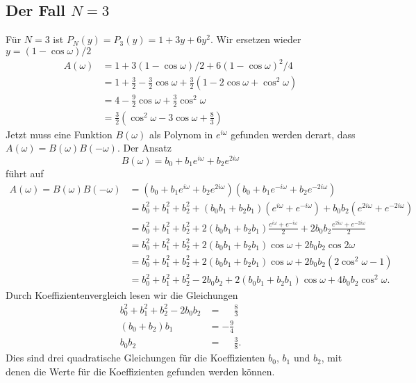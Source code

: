 \subsection{Der Fall $N=3$}
Für $N=3$ ist $P_N(y)=P_3(y)=1+3y+6y^2$.
Wir ersetzen wieder $y=(1-\cos\omega)/2$ 
\begin{align*}
A(\omega)
&=
1+3(1-\cos\omega)/2 + 6(1-\cos\omega)^2/4
\\
&=
1+\frac32-\frac32\cos\omega
+
\frac32(1-2\cos\omega+\cos^2\omega)
\\
&=
4
-
\frac92\cos\omega
+
\frac32\cos^2\omega
\\
&=
\frac32(\cos^2\omega -3\cos\omega + \frac{8}3)
\end{align*}
Jetzt muss eine Funktion $B(\omega)$ als Polynom in $e^{i\omega}$
gefunden werden derart, dass $A(\omega)=B(\omega)B(-\omega)$.
Der Ansatz
\[
B(\omega)
=
b_0 + b_1 e^{i\omega} + b_2 e^{2i\omega}
\]
führt auf
\begin{align*}
A(\omega)
=
B(\omega)B(-\omega)
&=
(b_0 + b_1 e^{i\omega} + b_2 e^{2i\omega})
(b_0 + b_1 e^{-i\omega} + b_2 e^{-2i\omega})
\\
&=
b_0^2 + b_1^2 + b_2^2
+
(b_0b_1 + b_2b_1)
(e^{i\omega}+e^{-i\omega})
+
b_0b_2
(e^{2i\omega}+e^{-2i\omega})
\\
&=
b_0^2 + b_1^2 + b_2^2
+
2(b_0b_1 + b_2b_1)
\frac{e^{i\omega}+e^{-i\omega}}2
+
2b_0b_2
\frac{e^{2i\omega}+e^{-2i\omega}}2
\\
&=
b_0^2 + b_1^2 + b_2^2
+
2(b_0b_1 + b_2b_1)
\cos\omega
+
2b_0b_2
\cos 2\omega
\\
&=
b_0^2 + b_1^2 + b_2^2
+
2(b_0b_1 + b_2b_1)
\cos\omega
+
2b_0b_2
(2\cos^2\omega-1)
\\
&=
b_0^2 + b_1^2 + b_2^2 -2b_0b_2
+
2(b_0b_1 + b_2b_1)
\cos\omega
+
4b_0b_2
\cos^2\omega.
\end{align*}
Durch Koeffizientenvergleich lesen wir die Gleichungen
\begin{align*}
b_0^2+b_1^2+b_2^2-2b_0b_2&=\phantom{-}\frac83
\\
(b_0+b_2)b_1 &= -\frac94
\\
b_0b_2
&=
\phantom{-}
\frac{3}{8}.
\end{align*}
Dies sind drei quadratische Gleichungen für die Koeffizienten
$b_0$, $b_1$ und $b_2$, mit denen die Werte für die Koeffizienten
gefunden werden können.



